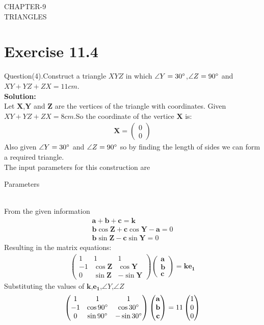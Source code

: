 \documentclass{article}
\newcommand{\myvec}[1]{\ensuremath{\begin{pmatrix}#1\end{pmatrix}}}
\let\vec\mathbf
\begin{document}
\begin{center}
        \textbf\large{CHAPTER-9 \\ TRIANGLES}
\end{center}
\section{Exercise 11.4}
Question(4).Construct a triangle $XYZ$ in which $\angle{Y}=30\degree$,$\angle{Z}=90\degree$ and $XY+YZ+ZX=11cm$. \\
\textbf{Solution:}\\
Let $\vec{X}$,$\vec{Y}$ and $\vec{Z}$ are the vertices of the triangle with coordinates.
Given $XY+YZ+ZX=8cm$.So the coordinate of the vertice  $\vec{X}$ is:
\begin{align}
{
\vec{X} =\myvec{0\\0}
}
\end{align}
Also given $\angle{Y}=30\degree$ and $\angle{Z}=90\degree$ so by finding the length of sides we can form a required triangle. \\
 The input parameters for this construction are\\
 \begin{table}[h]
	 \centering
	 
	 \caption{Parameters}
	 \label{tab:table1}
 \end{table}\\
From the given information\\
 \begin{align}
     \vec{a}+\vec{b}+\vec{c}=\vec{k}\\
	 \vec{b}\cos{\vec{Z}}+\vec{c}\cos{\vec{Y}}-\vec{a}=0\\
	 \vec{b}\sin{\vec{Z}}-\vec{c}\sin{\vec{Y}}=0
 \end{align}
 Resulting in the matrix equations:
 \begin{align}
	 \myvec{1 & 1 & 1\\-1 & \cos{\vec{Z}} & \cos{\vec{Y}}\\0 & \sin{\vec{Z}} & -\sin{\vec{Y}}}\myvec{\vec{a}\\ \vec{b}\\ \vec{c}}=\vec{k}\vec{e_1}
 \end{align}
 Substituting the values of $\vec{k}$,$\vec{e_1}$,$\angle{Y}$,$\angle{Z}$
 \begin{align}
     \myvec{1 & 1 & 1\\-1 & \cos{90\degree} & \cos{30\degree}\\ 0 & \sin{90\degree} & -\sin{30\degree}}\myvec{\vec{a}\\ \vec{b}\\ \vec{c}}= 11\myvec{1 \\ 0 \\ 0 }
 \end{align}
\end{document}
